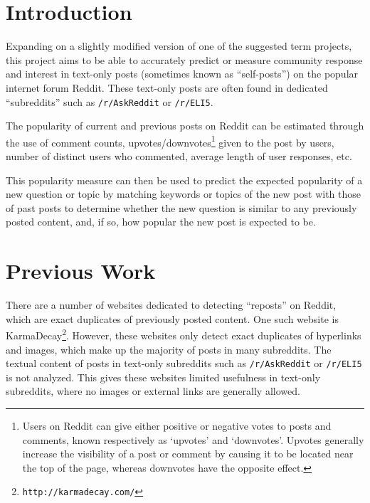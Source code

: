 \documentclass{acm_proc_article-sp}
\begin{document}



\section{Introduction}
Expanding on a slightly modified version of one of the suggested term projects,
this project aims to be able to accurately predict or measure community response
and interest in text-only posts (sometimes known as ``self-posts'') on the popular
internet forum Reddit.  These text-only posts are often found in dedicated ``subreddits''
such as \texttt{/r/AskReddit} or \texttt{/r/ELI5}.

The popularity of current and previous posts on Reddit can be estimated through the use
of comment counts, upvotes/downvotes\footnote{Users on Reddit can give either positive or
negative votes to posts and comments, known respectively as `upvotes' and `downvotes'.
Upvotes generally increase the visibility of a post or comment by causing it to be located
near the top of the page, whereas downvotes have the opposite effect.} given to the post by users, number of distinct
users who commented, average length of user responses, etc.

This popularity measure
can then be used to predict the expected popularity of a new question or topic by 
matching keywords or topics of the new post with those of past posts to determine
whether the new question is similar to any previously posted content, and, if so,
how popular the new post is expected to be.

\section{Previous Work}
There are a number of websites dedicated to detecting ``reposts'' on Reddit, which are
exact duplicates of previously posted content.  One such website is KarmaDecay\footnote{\texttt{http://karmadecay.com/}}.
However, these websites only detect exact duplicates of hyperlinks and images, which make
up the majority of posts in many subreddits.  The textual content of posts in text-only
subreddits such as \texttt{/r/AskReddit} or \texttt{/r/ELI5} is not analyzed.
This gives these websites limited usefulness in text-only subreddits, where no images or external
links are generally allowed.
\end{document}
